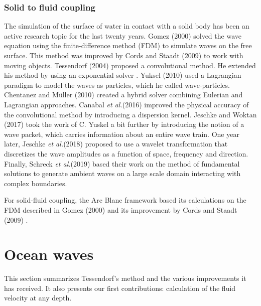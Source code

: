\documentclass[final]{jcgt}
\def\framework{the Arc Blanc framework\xspace}
\def\etal{\emph{et al.}\xspace}
\begin{document}
\subsubsection{Solid to fluid coupling}
\label{subsubsec:solidToFluidCoupling}
The simulation of the surface of water in contact with a solid body has been an active research topic for the last twenty years.
Gomez (2000) \cite{gomezInteractiveSimulationWater2000} solved the wave equation using the finite-difference method (FDM) to simulate waves on the free surface.
This method was improved by Cords and Staadt (2009) \cite{cordsRealTimeOpenWater2009} to work with moving objects.
Tessendorf (2004) \cite{tessendorfInteractiveWaterSurface2004} proposed a convolutional method.
He extended his method by using an exponential solver \cite{tessendorfEWaveUsingExponential2014}.
Yuksel (2010) \cite{yukselRealtimeWaterWaves2010} used a Lagrangian paradigm to model the waves as particles, which he called wave-particles.
Chentanez and Müller (2010) \cite{chentanezRealTimeSimulationLarge2010} created a hybrid solver combining Eulerian and Lagrangian approaches.
Canabal  \etal (2016) \cite{canabalDispersionKernelsWater2016} improved the physical accuracy of the convolutional method by introducing a dispersion kernel.
Jeschke and Woktan (2017) \cite{jeschkeWaterWavePackets2017} took the work of C. Yuskel a bit further by introducing the notion of a wave packet, which carries information about an entire wave train.
One year later, Jeschke  \etal (2018) \cite{jeschkeWaterSurfaceWavelets2018} proposed to use a wavelet transformation that discretizes the wave amplitudes as a function of space, frequency and direction.
Finally, Schreck  \etal (2019) \cite{schreckFundamentalSolutionsWater2019} based their work on the method of fundamental solutions to generate ambient waves on a large scale domain interacting with complex boundaries.

For solid-fluid coupling, \framework based its calculations on the FDM described in Gomez (2000) \cite{gomezInteractiveSimulationWater2000} and its improvement by Cords and Staadt (2009) \cite{cordsRealTimeOpenWater2009}.
\section{Ocean waves}
\label{sec:oceanWaves}
This section summarizes Tessendorf's method and the various improvements it has received.
It also presents our first contributions: calculation of the fluid velocity at any depth.
\end{document}
